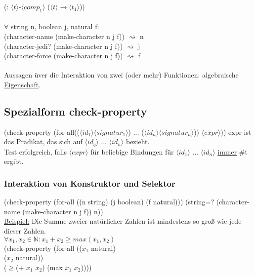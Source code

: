 \documentclass[a4paper,12pt]{article}
\begin{document}
(: $ \langle t \rangle$-$\langle comp_1 \rangle$ ($ \langle t \rangle \rightarrow \langle t_1 \rangle$))\\\\
$\forall$ string n, boolean j, natural f:\\
(character-name (make-character n j f)) $\rightsquigarrow$ n \\
(character-jedi? (make-character n j f)) $\rightsquigarrow$ j \\
(character-force (make-character n j f)) $\rightsquigarrow$ f \\
\\
Aussagen üver die Interaktion von zwei (oder mehr) Funktionen: algebraische \uline{Eigenschaft}.\\

\subsection{Spezialform check-property}
(check-property 
	(for-all(($\langle id_1\rangle \langle signatur_1\rangle$)
			   ...
			   ($\langle id_n\rangle \langle signatur_n\rangle$))
		$\langle expr \rangle$)) expr ist das Prädikat,  das sich auf $\langle id_q\rangle$ ... $\langle id_n\rangle$ bezieht.
		\\
Test erfolgreich, falls $\langle expr \rangle$ für beliebige Bindungen für $\langle id_1 \rangle$ ... $\langle id_n\rangle$ \uline{immer} \#t ergibt.\\

\subsubsection{Interaktion von Konstruktor und Selektor}
(check-property
	(for-all ((n string)
			  (j boolean)
			  (f natural)))
	(string=? (character-name (make-character n j f)) n))\\

\uline{Beispiel:} Die Summe zweier natürlicher Zahlen ist mindestens so groß wie jede dieser Zahlen. \\
$\forall x_1,x_2 \in \mathbb{N}: x_1 +x_2 \geq max(x_1,x_2)$\\
(check-property
	(for-all (($x_1$ natural)\\
			  ($x_2$ natural))\\
	($\geq$(+ $x_1$ $x_2$) (max $x_1$ $x_2$))))\\
	
\end{document}
